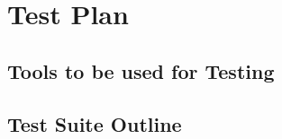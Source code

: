 \documentclass{scrreprt}
\begin{document}
\chapter{Test Plan}

\section{Tools to be used for Testing}



\section{Test Suite Outline}
\end{document}
